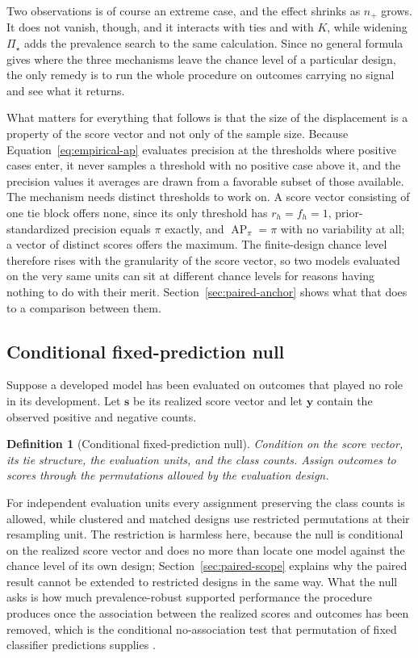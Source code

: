 \documentclass[11pt]{article}
\newcommand{\AP}{\operatorname{AP}}
\newcommand{\PSet}{\Pi_\star}
\newtheorem{definition}{Definition}
\theoremstyle{remark}
\begin{document}
Two observations is of course an extreme case, and the effect shrinks as $n_+$ grows. It does not vanish, though, and it interacts with ties and with $K$, while widening $\PSet$ adds the prevalence search to the same calculation. Since no general formula gives where the three mechanisms leave the chance level of a particular design, the only remedy is to run the whole procedure on outcomes carrying no signal and see what it returns.

What matters for everything that follows is that the size of the displacement is a property of the score vector and not only of the sample size. Because Equation~\eqref{eq:empirical-ap} evaluates precision at the thresholds where positive cases enter, it never samples a threshold with no positive case above it, and the precision values it averages are drawn from a favorable subset of those available. The mechanism needs distinct thresholds to work on. A score vector consisting of one tie block offers none, since its only threshold has $r_h=f_h=1$, prior-standardized precision equals $\pi$ exactly, and $\AP_\pi=\pi$ with no variability at all; a vector of distinct scores offers the maximum. The finite-design chance level therefore rises with the granularity of the score vector, so two models evaluated on the very same units can sit at different chance levels for reasons having nothing to do with their merit. Section~\ref{sec:paired-anchor} shows what that does to a comparison between them.

\subsection{Conditional fixed-prediction null}

Suppose a developed model has been evaluated on outcomes that played no role in its development. Let $\mathbf{s}$ be its realized score vector and let $\mathbf{y}$ contain the observed positive and negative counts.

\begin{definition}[Conditional fixed-prediction null]
Condition on the score vector, its tie structure, the evaluation units, and the class counts. Assign outcomes to scores through the permutations allowed by the evaluation design.
\end{definition}

For independent evaluation units every assignment preserving the class counts is allowed, while clustered and matched designs use restricted permutations at their resampling unit. The restriction is harmless here, because the null is conditional on the realized score vector and does no more than locate one model against the chance level of its own design; Section~\ref{sec:paired-scope} explains why the paired result cannot be extended to restricted designs in the same way. What the null asks is how much prevalence-robust supported performance the procedure produces once the association between the realized scores and outcomes has been removed, which is the conditional no-association test that permutation of fixed classifier predictions supplies \cite{ojala2010permutation}.
\end{document}
